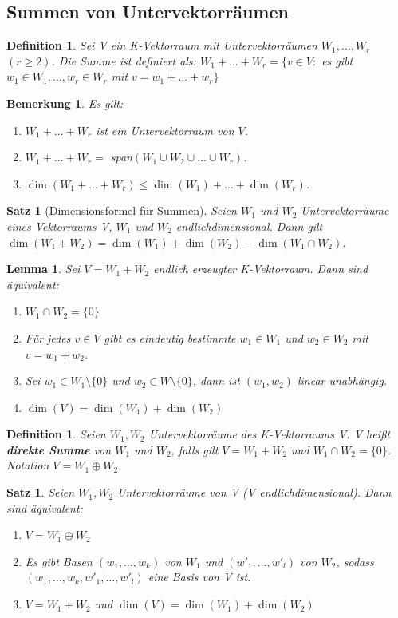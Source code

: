 \documentclass[12pt,a4paper]{article}
\theoremstyle{plain}
\newtheorem{Satz}[Theorem]{Satz}
\newtheorem{Lemma}[Theorem]{Lemma}
\newtheorem{Definition}[Theorem]{Definition}
\newtheorem{Bemerkung}[Theorem]{Bemerkung}
\newcommand{\herv}[1]{{\emph{\textbf{#1}}}}
\numberwithin{equation}{section}
\begin{document}
\subsection{Summen von Untervektorräumen}
\begin{Definition}
Sei V ein K-Vektorraum mit Untervektorräumen $W_1,\ldots,W_r$ $(r\geq 2)$. Die Summe ist definiert als: $W_1+\ldots+W_r=\{v\in V:$ es gibt $w_1\in W_1,\ldots, w_r\in W_r$ mit $v=w_1+\ldots+w_r\}$
\end{Definition}
\begin{Bemerkung}
Es gilt: \begin{enumerate}
\renewcommand{\labelenumi}{\alph{enumi})}
\item $W_1+\ldots+W_r$ ist ein Untervektorraum von $V$.
\item $W_1+\ldots+W_r=$ span$(W_1\cup W_2\cup \ldots \cup W_r)$.
\item $\dim(W_1+\ldots+W_r)\leq \dim(W_1)+\ldots+\dim(W_r)$.
\end{enumerate}
\end{Bemerkung}
\begin{Satz}[Dimensionsformel für Summen]
Seien $W_1$ und $W_2$ Untervektorräume eines Vektorraums V, $W_1$ und $W_2$ endlichdimensional. Dann gilt $\dim(W_1+W_2)=\dim(W_1)+\dim(W_2)-\dim(W_1\cap W_2)$.
\end{Satz}
\begin{Lemma}
Sei $V=W_1+W_2$ endlich erzeugter K-Vektorraum. Dann sind äquivalent: \begin{enumerate}
\renewcommand{\labelenumi}{\emph{(\roman{enumi})}}
\item $W_1\cap W_2=\{0\}$
\item Für jedes $v\in V$ gibt es eindeutig bestimmte $w_1\in W_1$ und $w_2\in W_2$ mit $v=w_1+w_2$.
\item Sei $w_1 \in W_1\setminus\{0\}$ und $w_2\in W\setminus\{0\}$, dann ist $(w_1,w_2)$ linear unabhängig.
\item $\dim(V)=\dim(W_1)+\dim(W_2)$
\end{enumerate}
\end{Lemma}
\begin{Definition}
Seien $W_1, W_2$ Untervektorräume des K-Vektorraums V. V heißt \herv{direkte Summe} von $W_1$ und $W_2$, falls gilt $V=W_1+W_2$ und $W_1\cap W_2=\{0\}$. Notation $V=W_1\oplus W_2$.
\end{Definition}
\begin{Satz}
Seien $W_1, W_2$ Untervektorräume von V (V endlichdimensional). Dann sind äquivalent:
\begin{enumerate}
\renewcommand{\labelenumi}{\emph{(\roman{enumi})}}
\item $V=W_1\oplus W_2$
\item Es gibt Basen $(w_1,\ldots,w_k)$ von $W_1$ und $(w'_1,\ldots,w'_l)$ von $W_2$, sodass $(w_1,\ldots,w_k,w'_1,\ldots,w'_l)$ eine Basis von V ist.
\item $V=W_1+W_2$ und $\dim(V)=\dim(W_1)+\dim(W_2)$
\end{enumerate}
\end{Satz}
\end{document}
